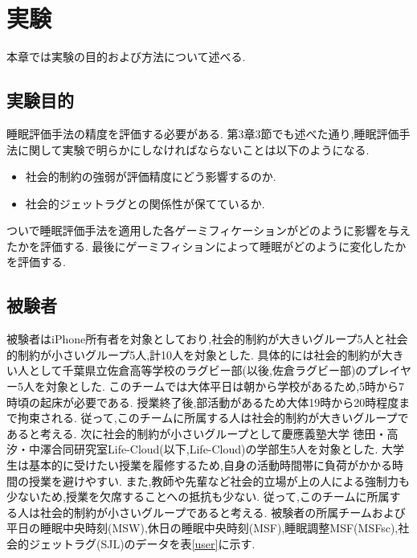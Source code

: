 \chapter{実験}
本章では実験の目的および方法について述べる.
\section{実験目的}
睡眠評価手法の精度を評価する必要がある.
第3章3節でも述べた通り,睡眠評価手法に関して実験で明らかにしなければならないことは以下のようになる.
\begin{itemize}
	\item 社会的制約の強弱が評価精度にどう影響するのか.
	\item 社会的ジェットラグとの関係性が保てているか.
\end{itemize}
ついで睡眠評価手法を適用した各ゲーミフィケーションがどのように影響を与えたかを評価する.
最後にゲーミフィションによって睡眠がどのように変化したかを評価する.

\section{被験者}

被験者はiPhone所有者を対象としており,社会的制約が大きいグループ5人と社会的制約が小さいグループ5人,計10人を対象とした.
具体的には社会的制約が大きい人として千葉県立佐倉高等学校のラグビー部(以後,佐倉ラグビー部)のプレイヤー5人を対象とした.
このチームでは大体平日は朝から学校があるため,5時から7時頃の起床が必要である.
授業終了後,部活動があるため大体19時から20時程度まで拘束される.
従って,このチームに所属する人は社会的制約が大きいグループであると考える.
次に社会的制約が小さいグループとして慶應義塾大学 徳田・高汐・中澤合同研究室Life-Cloud(以下,Life-Cloud)の学部生5人を対象とした.
大学生は基本的に受けたい授業を履修するため,自身の活動時間帯に負荷がかかる時間の授業を避けやすい.
また,教師や先輩など社会的立場が上の人による強制力も少ないため,授業を欠席することへの抵抗も少ない.
従って,このチームに所属する人は社会的制約が小さいグループであると考える.
被験者の所属チームおよび平日の睡眠中央時刻(MSW),休日の睡眠中央時刻(MSF),睡眠調整MSF(MSFsc),社会的ジェットラグ(SJL)のデータを表\ref{user}に示す.

